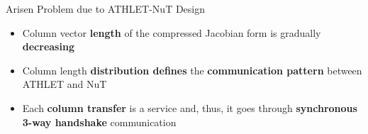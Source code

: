 \begin{frame}[t]{Arisen Problem due to ATHLET-NuT Design}
    \justifying
    \footnotesize

        \begin{itemize}
            \item Column vector \textbf{length} of the compressed Jacobian form is gradually \textbf{decreasing}
            
            \item Column length \textbf{distribution defines} the \textbf{communication pattern} between ATHLET and NuT
            
            \item Each \textbf{column transfer} is a service and, thus, it goes through \textbf{synchronous 3-way handshake} communication
            
        \end{itemize}



\end{frame}
